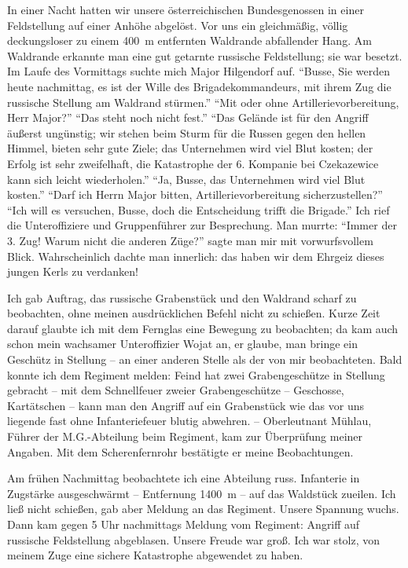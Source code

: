 \documentclass[a5paper,pagesize,10pt,twoside=true]{scrbook}
\begin{document}
In einer Nacht hatten wir unsere österreichischen Bundesgenossen in einer Feldstellung auf einer Anhöhe abgelöst. Vor uns ein gleichmäßig, völlig deckungsloser zu einem 400~m entfernten Waldrande abfallender Hang. Am Waldrande erkannte man eine gut getarnte russische Feldstellung; sie war besetzt. Im Laufe des Vormittags suchte mich Major Hilgendorf auf. \enquote{Busse, Sie werden heute nachmittag, es ist der Wille des Brigadekommandeurs, mit ihrem Zug die russische Stellung am Waldrand stürmen.} \enquote{Mit oder ohne Artillerievorbereitung, Herr Major?} \enquote{Das steht noch nicht fest.} \enquote{Das Gelände ist für den Angriff äußerst ungünstig; wir stehen beim Sturm für die Russen gegen den hellen Himmel, bieten sehr gute Ziele; das Unternehmen wird viel Blut kosten; der Erfolg ist sehr zweifelhaft, die Katastrophe der 6. Kompanie bei Czekazewice kann sich leicht wiederholen.} \enquote{Ja, Busse, das Unternehmen wird viel Blut kosten.} \enquote{Darf ich Herrn Major bitten, Artillerievorbereitung sicherzustellen?} \enquote{Ich will es versuchen, Busse, doch die Entscheidung trifft die Brigade.} Ich rief die Unteroffiziere und Gruppenführer zur Besprechung. Man murrte: \enquote{Immer der 3. Zug! Warum nicht die anderen Züge?} sagte man mir mit vorwurfsvollem Blick. Wahrscheinlich dachte man innerlich: das haben wir dem Ehrgeiz dieses jungen Kerls zu verdanken!

Ich gab Auftrag, das russische Grabenstück und den Waldrand scharf zu beobachten, ohne meinen ausdrücklichen Befehl nicht zu schießen. Kurze Zeit darauf glaubte ich mit dem Fernglas eine Bewegung zu beobachten; da kam auch schon mein wachsamer Unteroffizier Wojat an, er glaube, man bringe ein Geschütz in Stellung -- an einer anderen Stelle als der von mir beobachteten. Bald konnte ich dem Regiment melden: Feind hat zwei Grabengeschütze in Stellung gebracht -- mit dem Schnellfeuer zweier Grabengeschütze -- Geschosse, Kartätschen -- kann man den Angriff auf ein Grabenstück wie das vor uns liegende fast ohne Infanteriefeuer blutig abwehren. -- Oberleutnant Mühlau, Führer der M.G.-Abteilung beim Regiment, kam zur Überprüfung meiner Angaben. Mit dem Scherenfernrohr bestätigte er meine Beobachtungen.

Am frühen Nachmittag beobachtete ich eine Abteilung russ. Infanterie in Zugstärke ausgeschwärmt -- Entfernung 1400~m -- auf das Waldstück zueilen. Ich ließ nicht schießen, gab aber Meldung an das Regiment. Unsere Spannung wuchs. Dann kam gegen 5 Uhr nachmittags Meldung vom Regiment: Angriff auf russische Feldstellung abgeblasen. Unsere Freude war groß. Ich war stolz, von meinem Zuge eine sichere Katastrophe abgewendet zu haben. 
\end{document}
